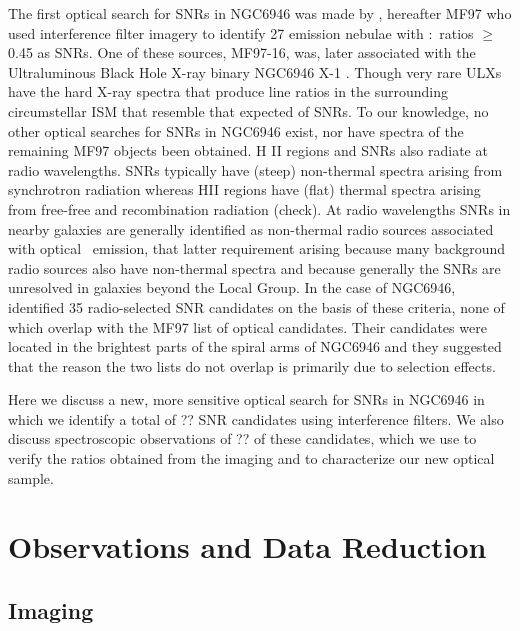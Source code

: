 The first optical search for SNRs in NGC6946 was made by \cite{matonick97}, hereafter MF97 who used interference filter imagery to identify 27 emission nebulae with \sii:\ha\ ratios $\geq$ 0.45 as SNRs.  One of these sources, MF97-16, was, later associated with the Ultraluminous Black Hole X-ray binary NGC6946 X-1 \cite{roberts03}. Though very rare ULXs have  the hard X-ray spectra  that produce line ratios in the surrounding circumstellar ISM that resemble that expected of SNRs. To our knowledge, no other optical searches for SNRs in NGC6946 exist, nor have spectra of the remaining MF97 objects been obtained.  H II regions and SNRs also radiate at radio wavelengths.  SNRs typically have (steep) non-thermal spectra arising from synchrotron radiation whereas HII regions have (flat) thermal spectra arising from free-free and recombination radiation (check).  At radio wavelengths SNRs in nearby galaxies are generally identified as non-thermal radio sources associated with optical \ha\ emission, that latter requirement arising because many background radio sources also have non-thermal spectra and because generally the SNRs are unresolved in galaxies beyond the Local Group.  In the case of NGC6946,  \cite{lacey01} identified 35 radio-selected SNR candidates on the basis of these criteria, none of which overlap with the MF97 list of optical candidates.  Their candidates were located in the brightest parts of the spiral arms of NGC6946 and they suggested that the reason the two lists do not overlap is primarily due to selection effects.

Here we discuss a new, more sensitive optical search for SNRs in NGC6946 in which we identify a total of ?? SNR candidates using interference filters.  We also discuss spectroscopic observations of ?? of these candidates, which we use to verify  the ratios obtained from the imaging and to characterize our new optical sample.

\section{Observations and Data Reduction \label{sec:observations}}
\subsection{Imaging}

